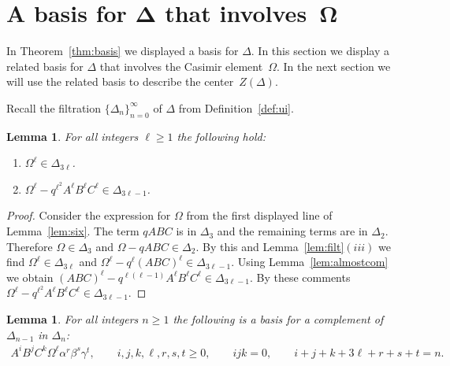 \documentclass[pdftex]{sigma}
\numberwithin{equation}{section}
\newtheorem{Lemma}[Theorem]{Lemma}
\begin{document}
\section[A basis for~$\Delta $ that involves~$\Omega$]{A basis for $\boldsymbol{\Delta}$ that involves~$\boldsymbol{\Omega}$}

 In Theorem~\ref{thm:basis} we displayed a basis for
$\Delta $. In this section we display a related
basis for $\Delta $ that involves the Casimir element~$\Omega$.
In the next section we will use the related basis
to describe  the center~$Z(\Delta )$.

 Recall the f\/iltration $\lbrace \Delta_n \rbrace_{n=0}^\infty$
of $\Delta $ from Def\/inition~\ref{def:ui}.


\begin{Lemma}
\label{lem:omegapower}
For all integers $\ell \geq 1$
the following hold:
\begin{enumerate}\itemsep=0pt
\item[$(i)$] $\Omega^\ell \in \Delta_{3 \ell}$.
\item[$(ii)$] $\Omega^\ell -q^{\ell^2}A^\ell B^\ell C^\ell  \in
\Delta_{3\ell-1}$.
\end{enumerate}
\end{Lemma}

\begin{proof}
Consider the expression for $\Omega$ from the
f\/irst displayed line of
Lemma~\ref{lem:six}.
The term $qABC$ is in $\Delta_3$
and the remaining terms are in $\Delta_2$. Therefore
$\Omega \in \Delta_3$ and $\Omega-qABC \in \Delta_2$. By this and
Lemma~\ref{lem:filt}$(iii)$ we f\/ind
$\Omega^\ell \in \Delta_{3\ell}$ and
$\Omega^\ell - q^\ell (ABC)^\ell
\in \Delta_{3\ell-1}$.
Using Lemma~\ref{lem:almostcom}  we obtain
$(ABC)^\ell -q^{\ell (\ell-1)}A^\ell B^\ell C^\ell \in \Delta_{3\ell -1}$.
By these comments
$\Omega^\ell -q^{\ell^2}A^\ell B^\ell C^\ell  \in \Delta_{3\ell-1}$.
\end{proof}

\begin{Lemma}
\label{lem:basis2c}
For all integers $n\geq 1$
the following is a basis
for a complement of
$\Delta_{n-1}$ in $\Delta_n$:
\begin{gather*}
 A^iB^jC^k\Omega^\ell \alpha^r \beta^s \gamma^t, \qquad
i,j,k,\ell, r,s,t\geq 0,
\qquad ijk=0,
 \qquad
i+j+k+3\ell+r+s+t = n.
\end{gather*}
\end{Lemma}
\end{document}
